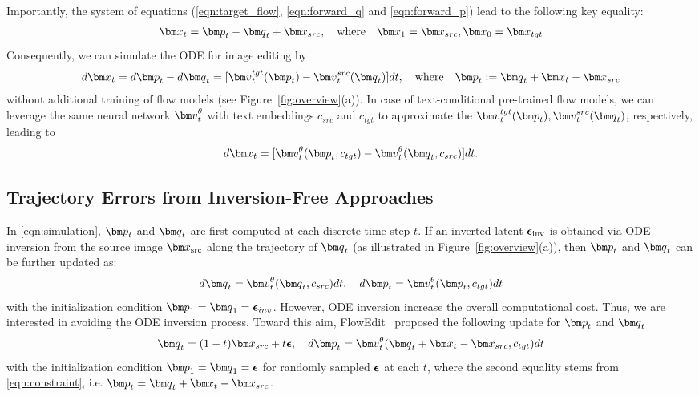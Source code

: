 Importantly, the system of equations (\eqref{eqn:target_flow}, \eqref{eqn:forward_q} and \eqref{eqn:forward_p}) lead to the following key equality:
\begin{align}
    \vx_t = \vp_t -\vq_t + \vx_{src}, \quad  \mbox{where}\quad \vx_1=\vx_{src}, \vx_0=\vx_{tgt}
    \label{eqn:constraint}
\end{align}
Consequently, we can simulate the  ODE for image editing by
\begin{align}\label{eqn:target_ode}
    d\vx_t = d\vp_t - d\vq_t = [\vv_t^{tgt}(\vp_t) -\vv_t^{src}(\vq_t)]dt, \quad \mbox{where}\quad \vp_t:= \vq_t+\vx_t-\vx_{src}
\end{align}
without additional training of flow models (see Figure~\ref{fig:overview}(a)). 
In case of text-conditional pre-trained flow models, we can leverage the same neural network $\vv_t^\theta$ with text embeddings $c_{src}$ and $c_{tgt}$   to approximate the $\vv_t^{tgt}(\vp_t), \vv_t^{src}(\vq_t)$, respectively, leading to  
\begin{align}
    d\vx_t = [\vv_t^\theta(\vp_t, c_{tgt}) - \vv_t^\theta(\vq_t, c_{src})]dt.
    \label{eqn:simulation}
\end{align}

\subsection{Trajectory Errors from  Inversion-Free Approaches}

In \eqref{eqn:simulation}, $\vp_t$ and $\vq_t$ are first computed at each discrete time step $t$. If an inverted latent ${\boldsymbol \epsilon}_{\text{inv}}$ is obtained via ODE inversion from the source image $\vx_{\text{src}}$ along the trajectory of $\vq_t$ (as illustrated in Figure~\ref{fig:overview}(a)), then $\vp_t$ and $\vq_t$ can be further updated as:
\begin{align}\label{eq:pq}
 d\vq_t = \vv_t^\theta(\vq_t,c_{src}) dt,\quad d\vp_t = \vv_t^\theta(\vp_t,c_{tgt}) dt
\end{align}
with  the initialization condition $\vp_1=\vq_1=\epsilonb_{inv}$.
However, ODE inversion increase the overall computational cost.
Thus,  we are interested in 
avoiding the ODE inversion process. 
Toward this aim, FlowEdit~\cite{kulikov2024flowedit} proposed the following update for $\vp_t$ and $\vq_t$
\begin{align}\label{eq:flowedit}
 \vq_t = (1-t)\vx_{src} + t \epsilonb, \quad d\vp_t = \vv_t^\theta(\vq_t+\vx_t-\vx_{src},c_{tgt}) dt
\end{align}
with the initialization condition $\vp_1=\vq_1=\epsilonb$ for randomly sampled ${\boldsymbol \epsilon}$ at each $t$,
where the second equality stems from  \eqref{eqn:constraint}, i.e. $\vp_t=\vq_t+\vx_t-\vx_{src}$.

